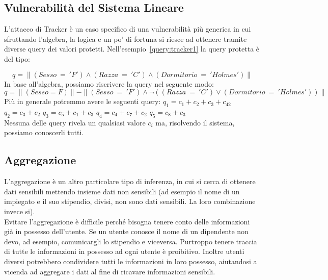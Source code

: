 \subsection{Vulnerabilità del Sistema Lineare}
L'attacco di Tracker è un caso specifico di una vulnerabilità più generica in cui sfruttando l'algebra, la logica e un po' di fortuna si riesce ad ottenere tramite diverse query dei valori protetti. Nell'esempio~\ref{query:tracker1} la query protetta è del tipo:

\begin{equation}
q = \parallel (Sesso \: = \: 'F') \wedge (Razza \: = \: 'C') \wedge (Dormitorio \: = \: 'Holmes') \parallel
\end{equation}
In base all'algebra, possiamo riscrivere la query nel seguente modo: 
\begin{equation}
q = \parallel (Sesso = F) \parallel - \parallel (Sesso \: = \: 'F') \wedge \neg( (Razza \: = \: 'C') \vee (Dormitorio \: = \: 'Holmes')) \parallel
\end{equation}
Più in generale potremmo avere le seguenti query:
\newline
\newline
$q_{1} = c_{1} + c_{2} + c_{3} + c_{42}$
\newline
$q_{2} = c_{3} + c_{2} $
\newline
$q_{3} = c_{5} + c_{1} + c_{3}$
\newline
$q_{4} = c_{4} + c_{7} + c_{2}$
\newline
$q_{5} = c_{8} + c_{3}$
\newline
\\
Nessuna delle query rivela un qualsiasi valore $c_{i}$ ma, risolvendo il sistema, possiamo conoscerli tutti.

\subsection{Aggregazione}
L'aggregazione è un altro particolare tipo di inferenza, in cui si cerca di ottenere dati sensibili mettendo insieme dati non sensibili (ad esempio il nome di un impiegato e il suo stipendio, divisi, non sono dati sensibili. La loro combinazione invece si). \\

Evitare l'aggregazione è difficile perché bisogna tenere conto delle informazioni già in possesso dell'utente. Se un utente conosce il nome di un dipendente non devo, ad esempio, comunicargli lo stipendio e viceversa. Purtroppo tenere traccia di tutte le informazioni in possesso ad ogni utente è proibitivo. Inoltre utenti diversi potrebbero condividere tutti le informazioni in loro possesso, aiutandosi a vicenda ad aggregare i dati al fine di ricavare informazioni sensibili.

